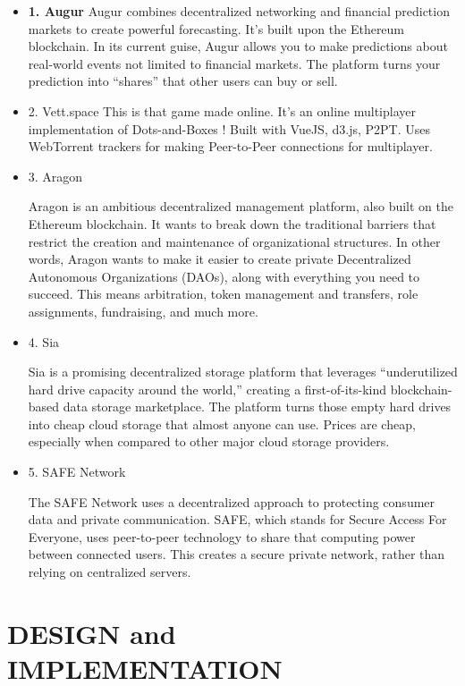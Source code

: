 \documentclass{fisatproject}
\begin{document}
\begin{itemize}
	\item \textbf{1. Augur}
	Augur combines decentralized networking and financial prediction markets to create powerful forecasting. It’s built upon the Ethereum blockchain. In its current guise, Augur allows you to make predictions about real-world events not limited to financial markets. The platform turns your prediction into “shares” that other users can buy or sell.
	

	\item 2. Vett.space
	This is that game made online. It's an online multiplayer implementation of Dots-and-Boxes !
	Built with VueJS, d3.js, P2PT. Uses WebTorrent trackers for making Peer-to-Peer connections for multiplayer.
	

	\item 3. Aragon
	
	Aragon is an ambitious decentralized management platform, also built on the Ethereum blockchain. It wants to break down the traditional barriers that restrict the creation and maintenance of organizational structures. In other words, Aragon wants to make it easier to create private Decentralized Autonomous Organizations (DAOs), along with everything you need to succeed. This means arbitration, token management and transfers, role assignments, fundraising, and much more.

	\item 4. Sia
	
	Sia is a promising decentralized storage platform that leverages “underutilized hard drive capacity around the world,” creating a first-of-its-kind blockchain-based data storage marketplace. The platform turns those empty hard drives into cheap cloud storage that almost anyone can use. Prices are cheap, especially when compared to other major cloud storage providers.
	
	\item 5. SAFE Network
	
	The SAFE Network uses a decentralized approach to protecting consumer data and private communication. SAFE, which stands for Secure Access For Everyone, uses peer-to-peer technology to share that computing power between connected users. This creates a secure private network, rather than relying on centralized servers.
\end{itemize}


\chapter{DESIGN and IMPLEMENTATION}
\end{document}
